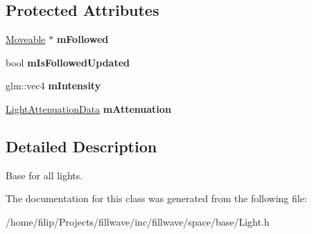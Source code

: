 \subsection*{Protected Attributes}
\begin{DoxyCompactItemize}
\item 
\hyperlink{classflw_1_1flf_1_1Moveable}{Moveable} $\ast$ {\bfseries m\+Followed}\hypertarget{classflw_1_1flf_1_1Light_a4f186929fcf2f2de8e22b55c72e68524}{}\label{classflw_1_1flf_1_1Light_a4f186929fcf2f2de8e22b55c72e68524}

\item 
bool {\bfseries m\+Is\+Followed\+Updated}\hypertarget{classflw_1_1flf_1_1Light_a19d2713688b231ecea3ed8ffefe5d61f}{}\label{classflw_1_1flf_1_1Light_a19d2713688b231ecea3ed8ffefe5d61f}

\item 
glm\+::vec4 {\bfseries m\+Intensity}\hypertarget{classflw_1_1flf_1_1Light_a45fd5157caf2cd94b8d2756b776f7232}{}\label{classflw_1_1flf_1_1Light_a45fd5157caf2cd94b8d2756b776f7232}

\item 
\hyperlink{structflw_1_1flf_1_1LightAttenuationData}{Light\+Attenuation\+Data} {\bfseries m\+Attenuation}\hypertarget{classflw_1_1flf_1_1Light_a095fa4c4d6b253e829711dc449e7b302}{}\label{classflw_1_1flf_1_1Light_a095fa4c4d6b253e829711dc449e7b302}

\end{DoxyCompactItemize}


\subsection{Detailed Description}
Base for all lights. 

The documentation for this class was generated from the following file\+:\begin{DoxyCompactItemize}
\item 
/home/filip/\+Projects/fillwave/inc/fillwave/space/base/Light.\+h\end{DoxyCompactItemize}
